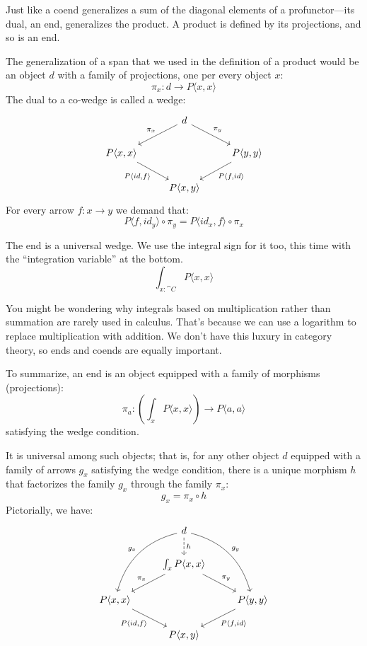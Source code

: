 \documentclass[DaoFP]{subfiles}
\begin{document}
Just like a coend generalizes a sum of the diagonal elements of a profunctor---its dual, an end, generalizes the product. A product is defined by its projections, and so is an end. 

The generalization of a span that we used in the definition of a product would be an object $d$ with a family of projections, one per every object $x$:
\[ \pi_x \colon d \to P \langle x, x \rangle \]
The dual to a co-wedge is called a wedge:
\[
 \begin{tikzcd}
 &d
 \arrow[ld, "\pi_x"']
 \arrow[rd, "\pi_y"]
 \\
 P \langle x, x \rangle
 \arrow[dr, "{P \langle id, f \rangle}"']
 &&P \langle y, y \rangle
 \arrow[dl, "{P \langle f, id \rangle}"]
 \\
 & P \langle x, y \rangle
 \end{tikzcd}
\]
For every arrow $f \colon x \to y$ we demand that:
\[ P \langle f, id_y \rangle \circ \pi_y = P \langle id_x, f \rangle \circ \pi_x \]

The end is a universal wedge. We use the integral sign for it too, this time with the ``integration variable'' at the bottom. 
\[ \int_{x \colon \cat C} P \langle x, x \rangle \]

You might be wondering why integrals based on multiplication rather than summation are rarely used in calculus. That's because we can use a logarithm to replace multiplication with addition. We don't have this luxury in category theory, so ends and coends are equally important.

To summarize, an end is an object equipped with a family of morphisms (projections):
\[ \pi_a \colon \left( \int_x P \langle x, x \rangle \right) \to P \langle a, a \rangle \]
satisfying the wedge condition. 

It is universal among such objects; that is, for any other object $d$ equipped with a family of arrows $g_x$ satisfying the wedge condition, there is a unique morphism $h$ that factorizes the family $g_x$ through the family $\pi_x$:
\[ g_x = \pi_x \circ h \]
Pictorially, we have:
\[
 \begin{tikzcd}
 &d
 \arrow[ddl, bend right, "g_x"']
 \arrow[ddr, bend left, "g_y"]
 \arrow[d, dashed, "h"]
 \\
 & \int_x P \langle x, x \rangle
 \arrow[ld, "\pi_x"']
 \arrow[rd, "\pi_y"]
 \\
 P \langle x, x \rangle
 \arrow[dr, "{P \langle id, f \rangle}"']
 &&P \langle y, y \rangle
 \arrow[dl, "{P \langle f, id \rangle}"]
 \\
 & P \langle x, y \rangle
 \end{tikzcd}
\]
\end{document}
